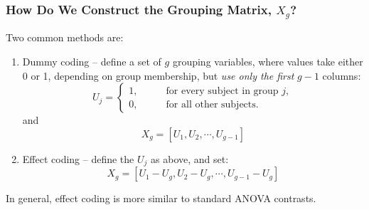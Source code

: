 \documentclass{beamer}
\begin{document}
\begin{frame}
  \frametitle{How Do We Construct the Grouping Matrix, $X_g$?}

Two common methods are: 

\begin{enumerate}
\item Dummy coding -- define a set of $g$ grouping variables, where values take either 0 or 1, depending on group membership, but \emph{use only the first} $g-1$ columns: 
%
\begin{equation*}
U_j = \left\{ 
\begin{aligned}
1, &\qquad \text{for every subject in group } j, \\
0, &\qquad \text{for all other subjects.}  
\end{aligned}
\right.
\end{equation*}
and 
%
$$
X_g= [U_1, U_2, \cdots, U_{g-1}]
$$
%
\item Effect coding -- define the $U_j$ as above, and set:
$$
X_g = [U_1 - U_g, U_2-U_g, \cdots, U_{g-1} - U_g]
$$
\end{enumerate}

In general, effect coding is more similar to standard ANOVA contrasts.

\end{frame}
\end{document}
